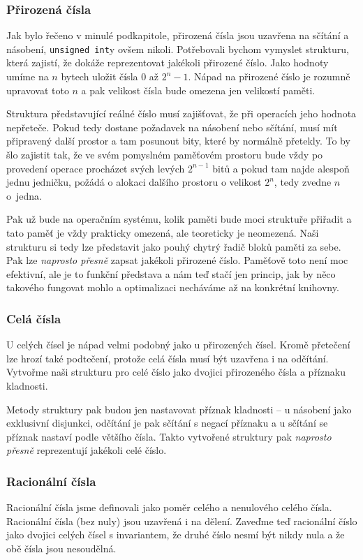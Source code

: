 \subsubsection{Přirozená čísla}
Jak bylo řečeno v minulé podkapitole, přirozená čísla jsou uzavřena na sčítání a násobení, \texttt{unsigned int}y ovšem nikoli. Potřebovali bychom vymyslet strukturu, která zajistí, že dokáže reprezentovat jakékoli přirozené číslo. Jako hodnoty umíme na $n$ bytech uložit čísla $0$ až $2^n-1$. Nápad na přirozené číslo je rozumně upravovat toto $n$ a pak velikost čísla bude omezena jen velikostí paměti.

Struktura představující reálné číslo musí zajišťovat, že při operacích jeho hodnota nepřeteče. Pokud tedy dostane požadavek na násobení nebo sčítání, musí mít připravený další prostor a tam posunout bity, které by normálně přetekly. To by šlo zajistit tak, že ve svém pomyslném paměťovém prostoru bude vždy po provedení operace procházet svých levých $2^{n-1}$ bitů a pokud tam najde alespoň jednu jedničku, požádá o alokaci dalšího prostoru o velikost $2^n$, tedy zvedne $n$ o~jedna.

Pak už bude na operačním systému, kolik paměti bude moci struktuře přiřadit a tato paměť je vždy prakticky omezená, ale teoreticky je neomezená. Naši strukturu si tedy lze představit jako pouhý chytrý řadič bloků paměti za sebe. Pak lze \textit{naprosto přesně} zapsat jakékoli přirozené číslo. Paměťově toto není moc efektivní, ale je to funkční představa a nám teď stačí jen princip, jak by něco takového fungovat mohlo a optimalizaci necháváme až na konkrétní knihovny.

\subsubsection{Celá čísla}
U celých čísel je nápad velmi podobný jako u přirozených čísel. Kromě přetečení lze hrozí také podtečení, protože celá čísla musí být uzavřena i na odčítání. Vytvořme naši strukturu pro celé číslo jako dvojici přirozeného čísla a příznaku kladnosti.

Metody struktury pak budou jen nastavovat příznak kladnosti -- u násobení jako exklusivní disjunkci, odčítání je pak sčítání s negací příznaku a u sčítání se příznak nastaví podle většího čísla. Takto vytvořené struktury pak \textit{naprosto přesně} reprezentují jakékoli celé číslo.

\subsubsection{Racionální čísla}
Racionální čísla jsme definovali jako poměr celého a nenulového celého čísla. Racionální čísla (bez nuly) jsou uzavřená i na dělení. Zaveďme teď racionální číslo jako dvojici celých čísel s invariantem, že druhé číslo nesmí být nikdy nula a že obě čísla jsou nesoudělná.

